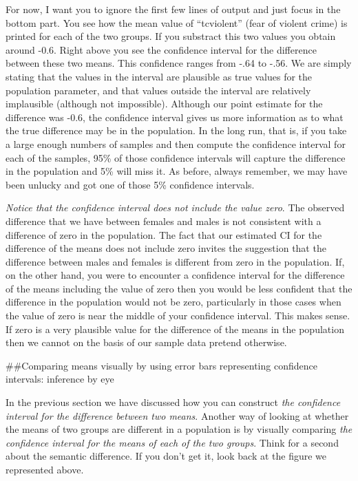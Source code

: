 \documentclass[]{book}
\theoremstyle{definition}
\theoremstyle{definition}
\theoremstyle{definition}
\theoremstyle{remark}
\begin{document}
For now, I want you to ignore the first few lines of output and just
focus in the bottom part. You see how the mean value of ``tcviolent''
(fear of violent crime) is printed for each of the two groups. If you
substract this two values you obtain around -0.6. Right above you see
the confidence interval for the difference between these two means. This
confidence ranges from -.64 to -.56. We are simply stating that the
values in the interval are plausible as true values for the population
parameter, and that values outside the interval are relatively
implausible (although not impossible). Although our point estimate for
the difference was -0.6, the confidence interval gives us more
information as to what the true difference may be in the population. In
the long run, that is, if you take a large enough numbers of samples and
then compute the confidence interval for each of the samples, 95\% of
those confidence intervals will capture the difference in the population
and 5\% will miss it. As before, always remember, we may have been
unlucky and got one of those 5\% confidence intervals.

\emph{Notice that the confidence interval does not include the value
zero}. The observed difference that we have between females and males is
not consistent with a difference of zero in the population. The fact
that our estimated CI for the difference of the means does not include
zero invites the suggestion that the difference between males and
females is different from zero in the population. If, on the other hand,
you were to encounter a confidence interval for the difference of the
means including the value of zero then you would be less confident that
the difference in the population would not be zero, particularly in
those cases when the value of zero is near the middle of your confidence
interval. This makes sense. If zero is a very plausible value for the
difference of the means in the population then we cannot on the basis of
our sample data pretend otherwise.

\#\#Comparing means visually by using error bars representing confidence
intervals: inference by eye

In the previous section we have discussed how you can construct
\emph{the confidence interval for the difference between two means}.
Another way of looking at whether the means of two groups are different
in a population is by visually comparing \emph{the confidence interval
for the means of each of the two groups}. Think for a second about the
semantic difference. If you don't get it, look back at the figure we
represented above.
\end{document}
